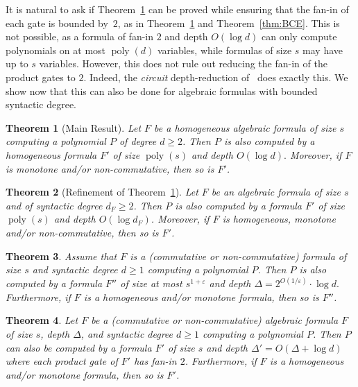 \documentclass[10pt,a4paper]{article}
\newtheorem{theorem}{Theorem}
\newcommand{\poly}{\mathop{\mathrm{poly}}}
\begin{document}
It is natural to ask if Theorem~\ref{thm:main-intro} can be proved while ensuring that the fan-in of each gate is bounded by~$2$, as in Theorem~\ref{thm:main-intro} and Theorem~\ref{thm:BCE}. This is not possible, as a formula of fan-in $2$ and depth $O(\log d)$ can only compute polynomials on at most $\poly(d)$ variables, while formulas of size $s$ may have up to $s$ variables. However, this does not rule out reducing the fan-in of the product gates to $2$. Indeed, the \emph{circuit} depth-reduction of~\cite{VSBR} does exactly this. We show now that this can also be done for algebraic formulas with bounded syntactic degree.


\begin{theorem}[Main Result]
\label{thm:main-intro}
Let $F$ be a homogeneous algebraic formula of size $s$ computing a polynomial $P$ of degree $d \geq 2$. Then $P$ is also computed by a homogeneous formula $F'$ of size $\poly(s)$ and depth $O(\log d).$ Moreover, if $F$ is monotone and/or non-commutative, then so is $F'$.
\end{theorem}

\begin{theorem}[Refinement of  Theorem~\ref{thm:main-intro}]
	\label{thm:main-syntactic-degree}
	Let $F$ be an algebraic formula of size $s$ and of syntactic degree \(d_F \geq 2\). Then $P$ is also computed by a formula $F'$ of size $\poly(s)$ and depth $O(\log d_F)$. Moreover, if $F$ is homogeneous, monotone and/or non-commutative, then so is $F'$.
\end{theorem}

\begin{theorem}
	\label{thm:strongermain}
	Assume that $F$ is a (commutative or non-commutative) formula of size $s$ and syntactic degree $d \geq 1$ computing a polynomial $P$. Then $P$ is also computed by a formula $F''$ of size at most $s^{1+\varepsilon}$ and depth $\Delta = 2^{O(1/\varepsilon)}\cdot \log d.$ Furthermore, if $F$ is a homogeneous and/or monotone formula, then so is $F''$.
\end{theorem}	

\begin{theorem}
	\label{thm:prodfanin}
	Let $F$ be a (commutative or non-commutative) algebraic formula $F$ of size $s$, depth $\Delta$, and syntactic degree \(d \geq 1\) computing a polynomial $P$. Then $P$ can also be computed by a formula $F'$ of size $s$ and depth $\Delta' = O(\Delta + \log d)$ where each product gate of $F'$ has fan-in $2$. Furthermore, if $F$ is a homogeneous and/or monotone formula, then so is $F'$.
\end{theorem}
\end{document}
